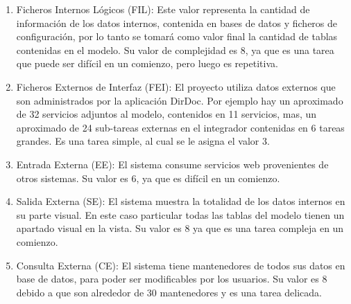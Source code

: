 \documentclass[a4paper,12pt,openany,oneside]{book}
\begin{document}
\begin{enumerate}
	\item Ficheros Internos Lógicos (FIL): Este valor representa la cantidad de información de los datos internos, contenida en bases de datos y ficheros de configuración, por lo tanto se tomará como valor final la cantidad de tablas contenidas en el modelo. Su valor de complejidad es 8, ya que es una tarea que puede ser difícil en un comienzo, pero luego es repetitiva.
	\item Ficheros Externos de Interfaz (FEI): El proyecto utiliza datos externos que son administrados por la aplicación DirDoc. Por ejemplo hay un aproximado de 32 servicios adjuntos al modelo, contenidos en 11 servicios, mas, un aproximado de 24 sub-tareas externas en el integrador contenidas en 6 tareas grandes. Es una tarea simple, al cual se le asigna el valor 3.
	\item Entrada Externa (EE): El sistema consume servicios web provenientes de otros sistemas. Su valor es 6, ya que es difícil en un comienzo.
	\item Salida Externa (SE): El sistema muestra la totalidad de los datos internos en su parte visual. En este caso particular todas las tablas del modelo tienen un apartado visual en la vista. Su valor es 8 ya que es una tarea compleja en un comienzo.
	\item Consulta Externa (CE): El sistema tiene mantenedores de todos sus datos en base de datos, para poder ser modificables por los usuarios. Su valor es 8 debido a que son alrededor de 30 mantenedores y es una tarea delicada.
\end{enumerate}
\end{document}
